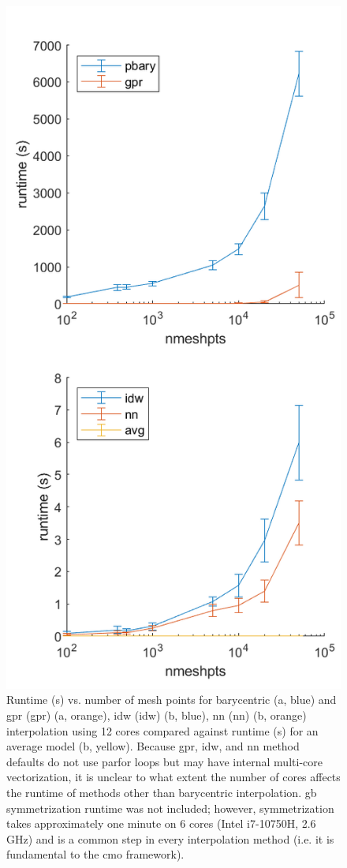 \documentclass[preprint,12pt]{elsarticle}
\begin{document}
\begin{figure}
    \centering
    \includegraphics{runtime.png}
    \caption{
    Runtime (s) vs. number of mesh points for barycentric (a, blue) and \acrlong{gpr} (\acrshort{gpr}) (a, orange), \acrlong{idw} (\acrshort{idw}) (b, blue), \acrlong{nn} (\acrshort{nn}) (b, orange) interpolation using 12 cores compared against runtime (s) for an average model (b, yellow). Because \acrshort{gpr}, \acrshort{idw}, and \acrshort{nn} method defaults do not use parfor loops but may have internal multi-core vectorization, it is unclear to what extent the number of cores affects the runtime of methods other than barycentric interpolation. \Acrlong{gb} symmetrization runtime was not included; however, symmetrization takes approximately one minute on 6 cores (Intel i7-10750H, 2.6 GHz) and is a common step in every interpolation method (i.e. it is fundamental to the \acrlong{cmo} framework).
}
\end{figure}
\end{document}
